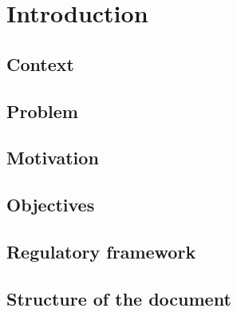 \chapter{Introduction}
\label{ch:introduction}


\section{Context}

\section{Problem}

\section{Motivation}

\section{Objectives}

\section{Regulatory framework}

\section{Structure of the document}

